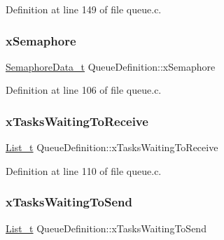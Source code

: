 Definition at line 149 of file queue.\+c.

\mbox{\label{struct_queue_definition_adb2c0818274974553c619ff953b6f477}} 
\subsubsection{\texorpdfstring{x\+Semaphore}{xSemaphore}}
{\footnotesize\ttfamily \hyperlink{externals_2freertos_2queue_8c_a37643b46fd5893e70242848a22aef310}{Semaphore\+Data\+\_\+t} Queue\+Definition\+::x\+Semaphore}



Definition at line 106 of file queue.\+c.

\mbox{\label{struct_queue_definition_af6d61526f77beee659cd604a0c473359}} 
\subsubsection{\texorpdfstring{x\+Tasks\+Waiting\+To\+Receive}{xTasksWaitingToReceive}}
{\footnotesize\ttfamily \hyperlink{externals_2freertos_2include_2list_8h_afd590ef6400071b4d63d65ef90bea7f4}{List\+\_\+t} Queue\+Definition\+::x\+Tasks\+Waiting\+To\+Receive}



Definition at line 110 of file queue.\+c.

\mbox{\label{struct_queue_definition_aaab135c4345cb0393d6ff3cd5164c7b2}} 
\subsubsection{\texorpdfstring{x\+Tasks\+Waiting\+To\+Send}{xTasksWaitingToSend}}
{\footnotesize\ttfamily \hyperlink{externals_2freertos_2include_2list_8h_afd590ef6400071b4d63d65ef90bea7f4}{List\+\_\+t} Queue\+Definition\+::x\+Tasks\+Waiting\+To\+Send}



